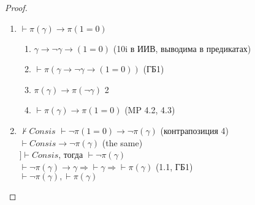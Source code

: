 \begin{proof}
\begin{enumerate}
\item $\vdash \pi(\gamma) \to \pi(1=0)$
\begin{enumerate}
\item $\gamma \to \lnot \gamma \to (1=0)$ (10i в ИИВ, выводима в предикатах)
\item $\vdash \pi(\gamma \to \lnot \gamma \to (1=0))$ (ГБ1)
\item $\pi(\gamma) \to \pi(\lnot \gamma)$ 2
\item $\vdash \pi(\gamma) \to \pi(1=0)$ (MP 4.2, 4.3)
\end{enumerate}
\item $\not \vdash Consis$
$\vdash \lnot \pi(1=0) \to \lnot \pi(\gamma)$ (контрапозиция 4)\\
$\vdash Consis \to \lnot \pi(\gamma)$ (the same)\\
$] \vdash Consis$, тогда $\vdash \lnot \pi(\gamma)$\\
$\vdash \lnot \pi(\gamma) \to \gamma \Rightarrow \vdash \gamma \Rightarrow \vdash \pi(\gamma)$ (1.1, ГБ1)\\
$\vdash \lnot \pi(\gamma), \vdash \pi(\gamma)$
\end{enumerate}
\end{proof}

